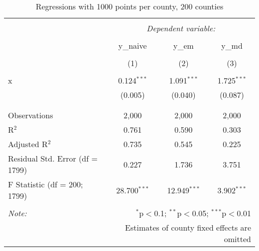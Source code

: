 
\begin{table}[!htbp] \centering 
  \caption{Regressions with 1000 points per county, 200 counties} 
  \label{} 
\begin{tabular}{@{\extracolsep{5pt}}lccc} 
\\[-1.8ex]\hline 
\hline \\[-1.8ex] 
 & \multicolumn{3}{c}{\textit{Dependent variable:}} \\ 
\cline{2-4} 
\\[-1.8ex] & y\_naive & y\_em & y\_md \\ 
\\[-1.8ex] & (1) & (2) & (3)\\ 
\hline \\[-1.8ex] 
 x & 0.124$^{***}$ & 1.091$^{***}$ & 1.725$^{***}$ \\ 
  & (0.005) & (0.040) & (0.087) \\ 
  & & & \\ 
\hline \\[-1.8ex] 
Observations & 2,000 & 2,000 & 2,000 \\ 
R$^{2}$ & 0.761 & 0.590 & 0.303 \\ 
Adjusted R$^{2}$ & 0.735 & 0.545 & 0.225 \\ 
Residual Std. Error (df = 1799) & 0.227 & 1.736 & 3.751 \\ 
F Statistic (df = 200; 1799) & 28.700$^{***}$ & 12.949$^{***}$ & 3.902$^{***}$ \\ 
\hline 
\hline \\[-1.8ex] 
\textit{Note:}  & \multicolumn{3}{r}{$^{*}$p$<$0.1; $^{**}$p$<$0.05; $^{***}$p$<$0.01} \\ 
 & \multicolumn{3}{r}{Estimates of county fixed effects are omitted} \\ 
\end{tabular} 
\end{table} 
